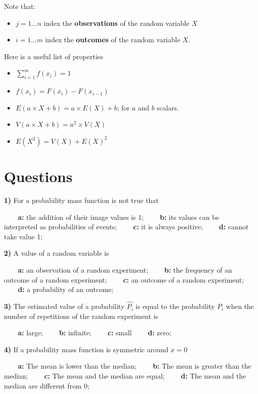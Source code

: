 \documentclass[
]{book}
\providecommand{\tightlist}{%
  \setlength{\itemsep}{0pt}\setlength{\parskip}{0pt}}
\begin{document}
Note that:

\begin{itemize}
\tightlist
\item
  \(j=1...n\) index the \textbf{observations} of the random variable \(X\)
\item
  \(i=1...m\) index the \textbf{outcomes} of the random variable \(X\).
\end{itemize}

Here is a useful list of properties

\begin{itemize}
\tightlist
\item
  \(\sum_{i=1}^m f(x_i)=1\)
\item
  \(f(x_i)=F(x_i)-F(x_{i-1})\)
\item
  \(E(a\times X +b)= a\times E(X) +b\); for \(a\) and \(b\) scalars.
\item
  \(V(a\times X +b)= a^2\times V(X)\)
\item
  \(E(X^2)=V(X)+E(X)^2\)
\end{itemize}

\hypertarget{questions-3}{%
\section{Questions}\label{questions-3}}

\textbf{1)} For a probability mass function is not true that

\textbf{\(\qquad\)a:} the addition of their image values is 1; \textbf{\(\qquad\)b:} its values can be interpreted as probabilities of events;
\textbf{\(\qquad\)c:} it is always positive;
\textbf{\(\qquad\)d:} cannot take value 1;

\textbf{2)} A value of a random variable is

\textbf{\(\qquad\)a:} an observation of a random experiment; \textbf{\(\qquad\)b:} the frequency of an outcome of a random experiment;
\textbf{\(\qquad\)c:} an outcome of a random experiment;
\textbf{\(\qquad\)d:} a probability of an outcome;

\textbf{3)} The estimated value of a probability \(\hat{P_i}\) is equal to the probability \(P_i\) when the number of repetitions of the random experiment is

\textbf{\(\qquad\)a:} large; \textbf{\(\qquad\)b:} infinite;
\textbf{\(\qquad\)c:} small
\textbf{\(\qquad\)d:} zero;

\textbf{4)} If a probability mass function is symmetric around \(x=0\)

\textbf{\(\qquad\)a:} The mean is lower than the median; \textbf{\(\qquad\)b:} The mean is greater than the median;
\textbf{\(\qquad\)c:} The mean and the median are equal;
\textbf{\(\qquad\)d:} The mean and the median are different from 0;
\end{document}
